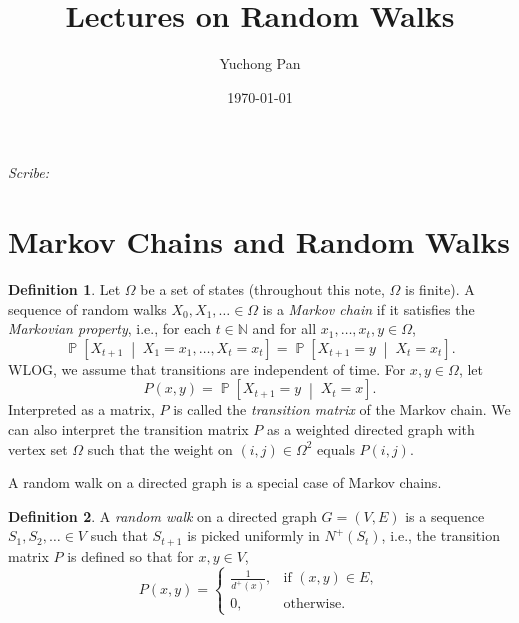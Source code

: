 \documentclass[letterpaper, reqno,11pt]{article}
\newcommand{\NN}{\mathbb{N}}
\newcommand{\PP}{\mathop{{}\mathbb{P}}}
\begin{document}
\title{Lectures on Random Walks}
\author{Yuchong Pan}
\date{\today}
\newtheorem{theorem}{Theorem}
\newtheorem{lemma}[theorem]{Lemma}
\newtheorem{proposition}[theorem]{Proposition}
\newtheorem{corollary}[theorem]{Corollary}
\newtheorem{fact}[theorem]{Fact}
\newtheorem{problem}[theorem]{Problem}
\newtheorem{claim}{Claim}
\newtheorem{exercise}{Exercise}
\theoremstyle{definition}
\newtheorem{definition}[theorem]{Definition}
%

\begin{framed}
 \hfill \thedate
\begin{center}
\Large{\thetitle}
\end{center}
 \hfill {\em Scribe: \theauthor}
\end{framed}

\section{Markov Chains and Random Walks}

\begin{definition}
  Let $\Omega$ be a set of states (throughout this note, $\Omega$ is finite). A sequence of random walks $X_0, X_1, \ldots \in \Omega$ is a \emph{Markov chain} if it satisfies the \emph{Markovian property}, i.e., for each $t \in \NN$ and for all $x_1, \ldots, x_t, y \in \Omega$,
  $$ \PP\left[X_{t + 1} \;\middle|\; X_1 = x_1, \ldots, X_t = x_t\right] = \PP\left[X_{t + 1} = y \;\middle|\; X_t = x_t\right]. $$
  WLOG, we assume that transitions are independent of time. For $x, y \in \Omega$, let
  $$ P(x, y) = \PP\left[X_{t + 1} = y \;\middle|\; X_t = x\right]. $$
  Interpreted as a matrix, $P$ is called the \emph{transition matrix} of the Markov chain. We can also interpret the transition matrix $P$ as a weighted directed graph with vertex set $\Omega$ such that the weight on $(i, j) \in \Omega^2$ equals $P(i, j)$.
\end{definition}

A random walk on a directed graph is a special case of Markov chains.

\begin{definition}
  A \emph{random walk} on a directed graph $G = (V, E)$ is a sequence $S_1, S_2, \ldots \in V$ such that $S_{t + 1}$ is picked uniformly in $N^+(S_t)$, i.e., the transition matrix $P$ is defined so that for $x, y \in V$,
  $$ P(x, y) = \left\{
    \begin{array}{ll}
      \frac{1}{d^+(x)}, & \text{if $(x, y) \in E$}, \\
      0, & \text{otherwise}.
    \end{array}
  \right. $$
\end{definition}
\end{document}
